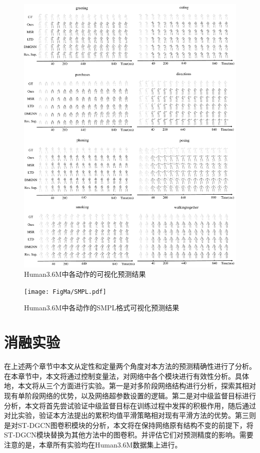 \begin{figure}[ht]
    \centering
    \includegraphics[width=1\textwidth]{FigMa/more_result.pdf}
    \caption{Human3.6M中各动作的可视化预测结果}
    \label{fig:more_result}
\end{figure}

\begin{figure}[ht]
    \centering
    \texttt{[image: FigMa/SMPL.pdf]}
    \caption{Human3.6M中各动作的SMPL格式可视化预测结果}
    \label{fig:SMPL}
\end{figure}

\clearpage

\section{消融实验}
在上述两个章节中本文从定性和定量两个角度对本方法的预测精确性进行了分析。在本章节中，本文将通过控制变量法，对网络中各个模块进行有效性分析。具体地，本文将从三个方面进行实验。第一是对多阶段网络结构进行分析，探索其相对现有单阶段网络的优势，以及网络超参数设置的逻辑。第二是对中级监督目标进行分析，本文将首先尝试验证中级监督目标在训练过程中发挥的积极作用，随后通过对比实验，验证本方法提出的累积均值平滑策略相对现有平滑方法的优势。第三则是对ST-DGCN图卷积模块的分析，本文将在保持网络原有结构不变的前提下，将ST-DGCN模块替换为其他方法中的图卷积。并评估它们对预测精度的影响。需要注意的是，本章所有实验均在Human3.6M数据集上进行。
